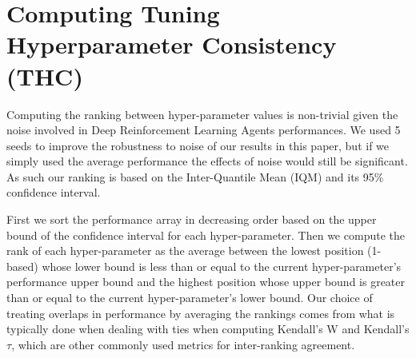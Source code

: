 \section{Computing Tuning Hyperparameter Consistency (THC)}
\label{sec:appendixTHC}
Computing the ranking between hyper-parameter values is non-trivial given the noise involved in Deep Reinforcement Learning Agents performances. We used 5 seeds to improve the robustness to noise of our results in this paper, but if we simply used the average performance the effects of noise would still be significant. As such our ranking is based on the Inter-Quantile Mean (IQM) \citep{agarwal2021deep} and its 95\% confidence interval.

First we sort the performance array in decreasing order based on the upper bound of the confidence interval for each hyper-parameter. Then we compute the rank of each hyper-parameter as the average between the lowest position (1-based) whose lower bound is less than or equal to the current hyper-parameter's performance upper bound and the highest position whose upper bound is greater than or equal to the current hyper-parameter's lower bound. Our choice of treating overlaps in performance by averaging the rankings comes from what is typically done when dealing with ties when computing Kendall's W and Kendall's $\tau$, which are other commonly used metrics for inter-ranking agreement.

